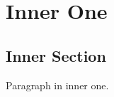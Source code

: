 \section{Inner One}\label{inner-one}

\subsection{Inner Section}\label{inner-section}

Paragraph in inner one.
